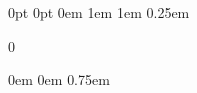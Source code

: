 

\DefineNewLength{\UWMad@Widest}         {0pt}        %
\DefineNewLength{\UWMad@WidestTest}     {0pt}        %
\DefineNewLength{\NomenTitleSkip}       {0em}        %
\DefineNewLength{\NomenPrintSkip}       {1em}        %
\DefineNewLength{\EntryMarginLeft}      {1em}
\DefineNewLength{\EntryMarginBottom}    {0.25em}

   {0}

\let\MakeNomenclatureStarred\UWMad@MakeNomenclatureStarredtrue
\let\MakeNomenclatureNotStarred\UWMad@MakeNomenclatureStarredfalse

\newcommand*{\UWMad@UpdateWidest}[1]{%
    \settowidth{\UWMad@WidestTest}{#1}%
    \ifdim\UWMad@Widest<\UWMad@WidestTest%
        \setlength{\UWMad@Widest}{\UWMad@WidestTest}%
    \fi%
}
%
%
\newcommand{\TheNomenclatureName}{Nomenclature}
\newcommand{\NomenclatureName}[1]
    {\renewcommand{\TheNomenclatureName}{#1}}
%
\newcommand{\TheNomenGroupName}{}
\newcommand{\NomenGroupName}[1]{
    \renewcommand{\TheNomenGroupName}{#1}
}
%
%
\newcommand{\NomenclatureNameStyle}{
    \ifdefempty{\TheNomenGroupName}%
        {}%
        {\ifUWMad@MakeNomenclatureStarred%
            \csname\TheCurrentSectioningCommand\endcsname*%
                {\TheNomenGroupName}%
            \UWMad@FrontMatterRegister%
                [\TheCurrentSectioningCommand]%
                {\TheNomenGroupName}
         \else%
            \csname\TheCurrentSectioningCommand\endcsname%
                {\TheNomenGroupName}%
         \fi}%
}
%
%
\newcommand{\TheCurrentSectioningCommand}{}
\newcommand{\CurrentSectioningCommand}[1]{
    \renewcommand{\TheCurrentSectioningCommand}{#1}
}


\DefineNewLength{\SymbolWidth}          {0em}
\DefineNewLength{\DescriptionWidth}     {0em}
\DefineNewLength{\SymbolDescriptionPad} {0.75em}


